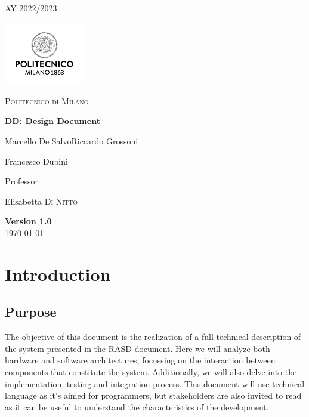 \documentclass[table, 12pt]{article}
\begin{document}
\begin{titlepage}
    \centering
    {\scshape\large AY 2022/2023 \par}
    \vfill
    \includegraphics[width=100pt]{assets/logo_polimi.jpg}\par\vspace{1cm}
    {\scshape\LARGE Politecnico di Milano \par}
    \vspace{1.5cm}
    {\huge\bfseries DD\@: Design Document \par}
    \vspace{2cm}
    {\Large {Marcello De Salvo\quad Riccardo Grossoni \par Francesco Dubini}\par}
    \vfill
    {\large Professor\par
        Elisabetta \textsc{Di Nitto}}
    \vfill
    {\large \textbf{Version 1.0}\\ \today \par}
\end{titlepage}


\thispagestyle{plain}
\mbox{}
\newpage
{}
\tableofcontents
\newpage
{}

\section{Introduction}

\subsection{Purpose}

The objective of this document is the realization of a full technical description of the system presented in the RASD document.
Here we will analyze both hardware and software architectures, focussing on the interaction between components that constitute the system.
Additionally, we will also delve into the implementation, testing and integration process.
This document will use technical language as it's aimed for programmers, but stakeholders are also invited to read as it can be useful to understand the characteristics of the development.
\end{document}
